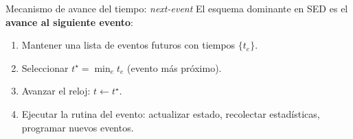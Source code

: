 \documentclass[aspectratio=1610, 9pt]{beamer}
\begin{document}
\begin{frame}{Mecanismo de avance del tiempo: \emph{next-event}}
\small
El esquema dominante en SED  es el \textbf{avance al siguiente evento}:

\begin{enumerate}
\item Mantener una lista de eventos futuros con tiempos $\{t_e\}$.
\item Seleccionar $t^\star=\min_e t_e$ (evento más próximo).
\item Avanzar el reloj: $t\leftarrow t^\star$.
\item Ejecutar la rutina del evento: actualizar estado, recolectar estadísticas, programar nuevos eventos.
\end{enumerate}

\vspace{6pt}
\begin{center}
\end{center}
\end{frame}
\end{document}
